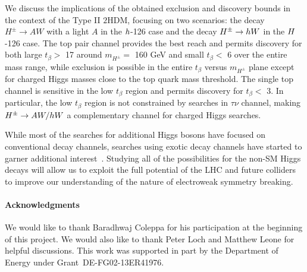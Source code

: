 We discuss the implications of the obtained exclusion and discovery bounds in the context of the Type II $2$HDM, focusing on two scenarios: the decay $H^{\pm} \rightarrow AW$ with a light $A$ in the $h$-126 case and the decay $H^{\pm} \rightarrow h W$ in the $H$-126 case.  The top pair channel provides the best reach and permits discovery for both large $t_{\beta}>$ 17 around $m_{H^{\pm}}=$ 160 GeV and small $t_{\beta}<$ 6 over the entire mass range, while exclusion is possible in the entire $t_{\beta}$ versus $m_{H^{\pm}}$ plane except for charged Higgs masses close to the top quark mass threshold. The single top channel is sensitive in the low $t_{\beta}$ region and permits discovery for $t_{\beta}<$ 3. In particular, the low $t_{\beta}$ region is not constrained by searches in $\tau\nu$ channel, making $H^{\pm} \rightarrow AW/h W$ a complementary channel for charged Higgs searches.

While most of the searches for additional Higgs bosons have focused on conventional decay channels, searches using exotic decay channels have started to garner additional interest~\cite{Curtin:2013fra, Brownson:2013lka, Coleppa:2014hxa, Coleppa:2014cca,Li:2015lra,Dorsch:2014qja,Chen:2013emb,Chen:2014dma,Enberg:2014pua,CMS:2014yra,Aad:2015wra,CMS:2013eua}. Studying all of the possibilities for the non-SM Higgs decays will allow us to exploit the full potential of the LHC and future colliders to improve our understanding of the nature of electroweak symmetry breaking.
\paragraph{Acknowledgments}
We would like to thank Baradhwaj Coleppa for his participation at the beginning of this project. We would also like to thank Peter Loch and Matthew Leone for helpful discussions. This work was supported in part by the Department of Energy under Grant~DE-FG02-13ER41976. 

